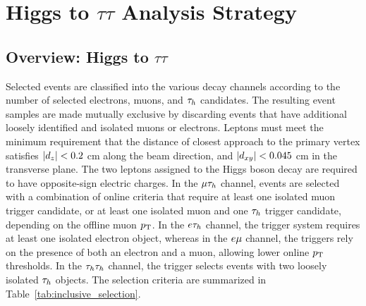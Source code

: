 \chapter{Higgs to $\tau\tau$ Analysis Strategy}

\section{Overview: Higgs to $\tau\tau$}

Selected events are classified into the various decay channels according to
the number of selected electrons, muons, and $\tau_{h}$ candidates.
The resulting event samples are made mutually exclusive by discarding events that have additional loosely identified
and isolated muons or electrons.
Leptons must meet the minimum requirement
that the distance of closest approach to the primary vertex satisfies $\lvert d_z\rvert<0.2$ cm
along the beam direction, and $\lvert d_{xy}\rvert<0.045$ cm in the transverse plane.
The two leptons assigned to the Higgs boson decay are required to have opposite-sign electric charges.
In the $\mu\tau_{h}$ channel, events are selected with a combination of online criteria that require at least one isolated muon trigger candidate, or at least one isolated muon and one $\tau_{h}$ trigger candidate, depending on the offline muon $p_\mathrm{T}$. In the $e\tau_{h}$ channel, the trigger system requires at least one isolated
electron object, whereas in the $e\mu$ channel, the triggers  rely on the presence of both an electron and a muon, allowing
lower online $p_\mathrm{T}$ thresholds.
In the $\tau_{h}\tau_{h}$ channel, the trigger selects events with two loosely isolated $\tau_{h}$ objects.
The selection criteria are summarized in Table~\ref{tab:inclusive_selection}.

